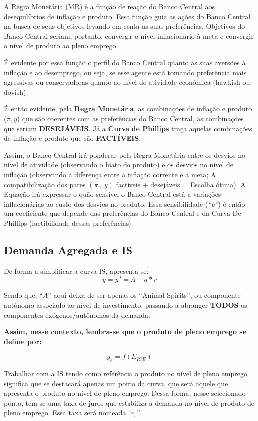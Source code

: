 \documentclass[a4paper,12pt]{article}[abntex2]
\begin{document}
A Regra Monetária (MR) é a função de reação do Banco Central aos desequilíbrios de inflação e produto. Essa função guia as ações do Banco Central na busca de seus objetivos levando em conta as suas preferências. Objetivos do Banco Central seriam, portanto, convergir o nível inflacionário à meta e convergir o nível de produto ao pleno emprego.

É evidente por essa função o perfil do Banco Central quanto às suas aversões à inflação e ao desemprego, ou seja, se esse agente está tomando preferência mais agressivas ou conservadoras quanto ao nível de atividade econômica (hawkish ou dovish).

É então evidente, pela \textbf{Regra Monetária}, as combinações de inflação e produto (\(\pi, y\)) que são coerentes com as preferências do Banco Central, as combinações que seriam \textbf{DESEJÁVEIS}. Já a \textbf{Curva de Phillips} traça aquelas combinações de inflação e produto que são \textbf{FACTÍVEIS}.

Assim, o Banco Central irá ponderar pela Regra Monetária entre os desvios no nível de atividade (observando o hiato do produto) e os desvios no nível de inflação (observando a diferença entre a inflação corrente e a meta; A compatibilização dos pares \((\pi \ , \ y)\) factíveis + desejáveis = Escolha ótima). A Equação irá expressar o quão sensível o Banco Central está a variações inflacionárias ao custo dos desvios no produto. Essa sensibilidade (\textit{``b''}) é então um coeficiente que depende das preferências do Banco Central e da Curva De Phillips (factibilidade dessas preferências).

\subsection{\textbf{Demanda Agregada e IS}}
De forma a simplificar a curva IS, apresenta-se:
\[
y = y^d = A - a * r \tag{1}
\]

Sendo que, ``\( A \)'' aqui deixa de ser apenas os ``Animal Spirits'', ou componente autônomo associado ao nível de investimento, passando a abranger \textbf{TODOS} os componentes exógenos/autônomos da demanda.

\textbf{Assim, nesse contexto, lembra-se que o produto de pleno emprego se define por:}

\[
y_e = f(E_{ICE})
\]

Trabalhar com a IS tendo como referência o produto no nível de pleno emprego significa que se destacará apenas um ponto da curva, que será aquele que apresenta o produto no nível de pleno emprego. Dessa forma, nesse selecionado ponto, tem-se uma taxa de juros que estabiliza a demanda no nível de produto de pleno emprego. Essa taxa será nomeada ``\( r_s \)''.
\end{document}
